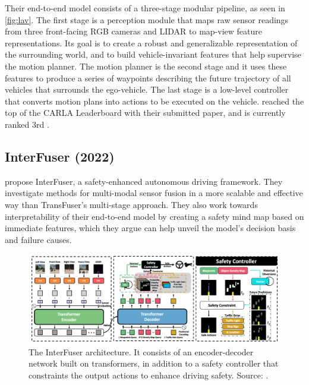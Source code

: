 Their end-to-end model consists of a three-stage modular pipeline, as seen in \cref{fig:lav}. The first stage is a perception module that maps raw sensor readings from three front-facing RGB cameras and LIDAR to map-view feature representations. Its goal is to create a robust and generalizable representation of the surrounding world, and to build vehicle-invariant features that help supervise the motion planner. The motion planner is the second stage and it uses these features to produce a series of waypoints describing the future trajectory of all vehicles that surrounds the ego-vehicle. The last stage is a low-level controller that converts motion plans into actions to be executed on the vehicle. \textcite{chen2022lav} reached the top of the CARLA Leaderboard with their submitted paper, and is currently ranked 3rd \cite{chen2022lav, pwc-carla}.


\subsection{InterFuser (2022)}
\textcite{shao2022interfuser} propose InterFuser, a safety-enhanced autonomous driving framework. They investigate methods for multi-modal sensor fusion in a more scalable and effective way than TransFuser's multi-stage approach. They also work towards interpretability of their end-to-end model by creating a safety mind map based on immediate features, which they argue can help unveil the model's decision basis and failure causes.

\begin{figure}[htbp]
    \centering
    \includegraphics[width=\textwidth]{figures/2/interfuser.png}
    \caption{The InterFuser architecture. It consists of an encoder-decoder network built on transformers, in addition to a safety controller that constraints the output actions to enhance driving safety. Source: \cite{shao2022interfuser}.}
    \label{fig:interfuser}
\end{figure}

